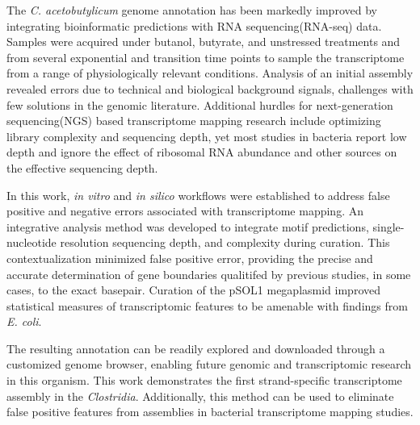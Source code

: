 

The {\it C. acetobutylicum} genome annotation has been markedly improved by integrating bioinformatic predictions with RNA sequencing(RNA-seq) data. Samples were acquired under butanol, butyrate, and unstressed treatments and from several exponential and transition time points to sample the transcriptome from a range of physiologically relevant conditions. Analysis of an initial assembly revealed errors due to technical and biological background signals, challenges with few solutions in the genomic literature. Additional hurdles for next-generation sequencing(NGS) based transcriptome mapping research include optimizing library complexity and sequencing depth, yet most studies in bacteria report low depth and ignore the effect of ribosomal RNA abundance and other sources on the effective sequencing depth. 

In this work, \textit{in vitro} and \textit{in silico} workflows were established to address false positive and negative errors associated with transcriptome mapping. An integrative analysis method was developed to integrate motif predictions, single-nucleotide resolution sequencing depth, and complexity during curation. This contextualization minimized false positive error, providing the precise and accurate determination of gene boundaries qualitifed by previous studies, in some cases, to the exact basepair. Curation of the pSOL1 megaplasmid improved statistical measures of transcriptomic features to be amenable with findings from \textit{E. coli}. 

The resulting annotation can be readily explored and downloaded through a customized genome browser, enabling future genomic and transcriptomic research in this organism. This work demonstrates the first strand-specific transcriptome assembly in the \textit{Clostridia}. Additionally, this method can be used to eliminate false positive features from assemblies in bacterial transcriptome mapping studies. 